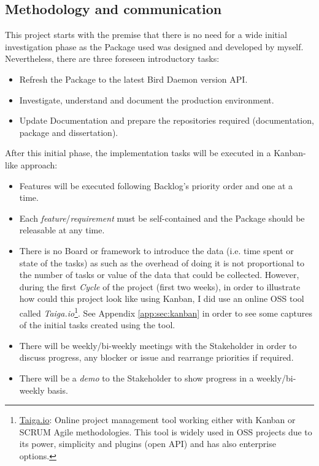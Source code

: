 \subsection{Methodology and communication}
This project starts with the premise that there is no need for a wide initial investigation phase as the Package used was designed and developed by myself. Nevertheless, there are three foreseen introductory tasks:
\begin{itemize}
    \item Refresh the Package to the latest Bird Daemon version API. 
    \item Investigate, understand and document the production environment.
    \item Update Documentation and prepare the repositories required (documentation, package and dissertation).
\end{itemize}

After this initial phase, the implementation tasks will be executed in a Kanban-like approach:
\begin{itemize}
    \item Features will be executed following Backlog's priority order and one at a time.
    \item Each \textit{feature}/\textit{requirement} must be self-contained and the Package should be releasable at any time.
    \item There is no Board or framework to introduce the data (i.e. time spent or state of the tasks) as such as the overhead of doing it is not proportional to the number of tasks or value of the data that could be collected. However, during the first \textit{Cycle} of the project (first two weeks), in order to illustrate how could this project look like using Kanban, I did use an online OSS tool called \textit{Taiga.io}\footnote{\href{https://taiga.io/}{Taiga.io}: Online project management tool working either with Kanban or SCRUM Agile methodologies. This tool is widely used in OSS projects due to its power, simplicity and plugins (open API) and has also enterprise options.}. See Appendix \ref{app:sec:kanban} in order to see some captures of the initial tasks created using the tool.
    \item There will be weekly/bi-weekly meetings with the Stakeholder in order to discuss progress, any blocker or issue and rearrange priorities if required.
    \item There will be a \textit{demo} to the Stakeholder to show progress in a weekly/bi-weekly basis.
\end{itemize}

